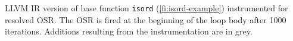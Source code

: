 \label{fig:isordfrom} LLVM IR version of base function {\tt isord} (\myfigure\ref{fi:isord-example}) instrumented for resolved OSR. The OSR is fired at the beginning of the loop body after 1000 iterations. Additions resulting from the instrumentation are in grey.
